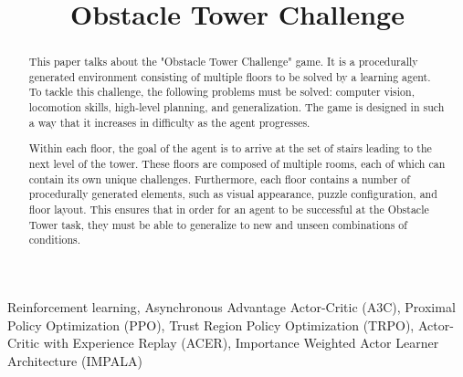 \documentclass[conference]{IEEEtran}
\begin{document}
\title{Obstacle Tower Challenge}

\author{
\and
{}
\and
{}
\and
{}
}

\maketitle

\begin{abstract}
This paper talks about the "Obstacle Tower Challenge" game. It is a procedurally generated environment consisting of multiple floors to be solved by a learning agent. To tackle this challenge, the following problems must be solved: computer vision, locomotion skills, high-level planning, and generalization. The game is designed in such a way that it increases in difficulty as the agent progresses.

Within each floor, the goal of the agent is to arrive at the set of stairs leading to the next level of the tower. These floors are composed of multiple rooms, each of which can contain its own unique challenges. Furthermore, each floor contains a number of procedurally generated elements, such as visual appearance, puzzle configuration, and floor layout. This ensures that in order for an agent to be successful at the Obstacle Tower task, they must be able to generalize to new and unseen combinations of conditions.
\end{abstract}

\begin{IEEEkeywords}
Reinforcement learning, Asynchronous Advantage Actor-Critic (A3C), Proximal Policy Optimization (PPO), Trust Region Policy Optimization (TRPO), Actor-Critic with Experience Replay (ACER), Importance Weighted Actor Learner Architecture (IMPALA)
\end{IEEEkeywords}
\end{document}
